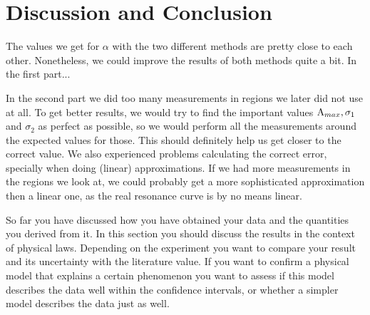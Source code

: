 \section{Discussion and Conclusion}
The values we get for $\alpha$ with the two different methods are pretty close to each other.
Nonetheless, we could improve the results of both methods quite a bit. 
In the first part...

In the second part we did too many measurements in regions we later did not use at all.
To get better results, we would try to find the important values $\A_{max}, \sigma_1$ and $\sigma_2$ as perfect as possible, so we would perform all the measurements around the expected values for those.
This should definitely help us get closer to the correct value.
We also experienced problems calculating the correct error, specially when doing (linear) approximations.
If we had more measurements in the regions we look at, we could probably get a more sophisticated approximation then a linear one, as the real resonance curve is by no means linear.







So far you have discussed how you have obtained your data and the
quantities you derived from it. In this section you should discuss
the results in the context of physical laws. Depending on the
experiment you want to compare your result and its uncertainty with
the literature value. If you want to confirm a physical model that
explains a certain phenomenon you want to assess if this model
describes the data well within the confidence intervals, or whether
a simpler model describes the data just as well.